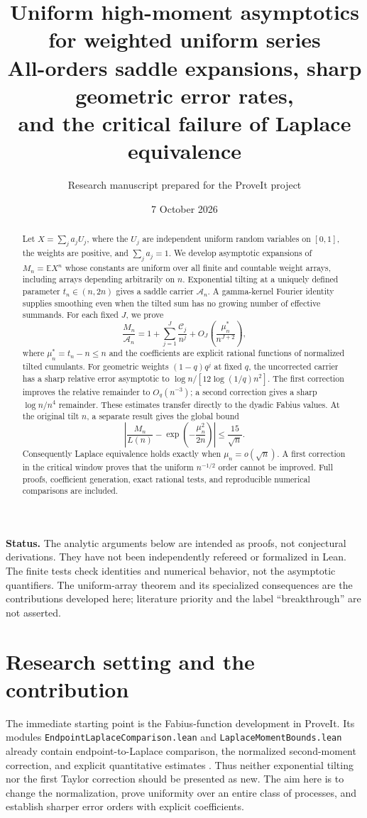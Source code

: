 \documentclass[11pt,a4paper]{article}
\title{\textbf{Uniform high-moment asymptotics\\for weighted uniform series}\\[4mm]
\large All-orders saddle expansions, sharp geometric error rates,\\and the critical failure of Laplace equivalence}
\author{Research manuscript prepared for the ProveIt project}
\date{7 October 2026}
\numberwithin{equation}{section}
\theoremstyle{definition}\newtheorem{definition}[theorem]{Definition}
\theoremstyle{remark}\newtheorem{remark}[theorem]{Remark}
\newcommand{\E}{\mathbb E}
\newcommand{\Cj}{\mathscr C}
\newcommand{\A}{\mathcal A}
\begin{document}
\maketitle
\begin{abstract}
Let $X=\sum_j a_jU_j$, where the $U_j$ are independent uniform random variables on $[0,1]$, the weights are positive, and $\sum_j a_j=1$. We develop asymptotic expansions of $M_n=\E X^n$ whose constants are uniform over all finite and countable weight arrays, including arrays depending arbitrarily on $n$. Exponential tilting at a uniquely defined parameter $t_n\in(n,2n)$ gives a saddle carrier $\A_n$. A gamma-kernel Fourier identity supplies smoothing even when the tilted sum has no growing number of effective summands. For each fixed $J$, we prove
\[
 \frac{M_n}{\A_n}=1+\sum_{j=1}^{J}\frac{\Cj_j}{n^j}
       +O_J\!\left(\frac{\mu_n^*}{n^{J+2}}\right),
\]
where $\mu_n^*=t_n-n\le n$ and the coefficients are explicit rational functions of normalized tilted cumulants. For geometric weights $(1-q)q^j$ at fixed $q$, the uncorrected carrier has a sharp relative error asymptotic to $\log n/[12\log(1/q)n^2]$. The first correction improves the relative remainder to $O_q(n^{-3})$; a second correction gives a sharp $\log n/n^4$ remainder. These estimates transfer directly to the dyadic Fabius values. At the original tilt $n$, a separate result gives the global bound
\[
 \left|\frac{M_n}{L(n)}-\exp\!\left(-\frac{\mu_n^2}{2n}\right)\right|
 \le \frac{15}{\sqrt n}.
\]
Consequently Laplace equivalence holds exactly when $\mu_n=o(\sqrt n)$. A first correction in the critical window proves that the uniform $n^{-1/2}$ order cannot be improved. Full proofs, coefficient generation, exact rational tests, and reproducible numerical comparisons are included.
\end{abstract}
\noindent\textbf{Status.} The analytic arguments below are intended as proofs, not conjectural derivations. They have not been independently refereed or formalized in Lean. The finite tests check identities and numerical behavior, not the asymptotic quantifiers. The uniform-array theorem and its specialized consequences are the contributions developed here; literature priority and the label ``breakthrough'' are not asserted.

\newpage
\tableofcontents
\newpage

\section{Research setting and the contribution}
\label{sec:setting}
The immediate starting point is the Fabius-function development in ProveIt. Its modules \texttt{EndpointLaplaceComparison.lean} and \texttt{LaplaceMomentBounds.lean} already contain endpoint-to-Laplace comparison, the normalized second-moment correction, and explicit quantitative estimates \cite{proveitendpoint,proveitbounds}. Thus neither exponential tilting nor the first Taylor correction should be presented as new. The aim here is to change the normalization, prove uniformity over an entire class of processes, and establish sharper error orders with explicit coefficients.
\end{document}
